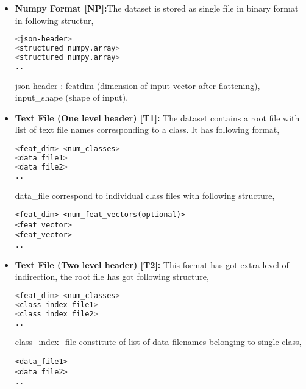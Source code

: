 \begin{itemize}
\item{\textbf {Numpy Format [NP]:}The dataset is stored as single file in binary format in following structur,
\begin{lstlisting}[language=bash,basicstyle=\small] 
<json-header>
<structured numpy.array>
<structured numpy.array>
..
\end{lstlisting}
json-header  : featdim (dimension of input vector after flattening), input\_shape (shape of input).}

\item{\textbf {Text File (One level header) [T1]:} The dataset contains a root file with list of  text file names corresponding to a class. It has following format,
\begin{lstlisting}[language=bash,basicstyle=\small] 
<feat_dim> <num_classes>
<data_file1>
<data_file2>
..
\end{lstlisting}
data\_file correspond to individual class files with following structure,
\begin{lstlisting}[basicstyle=\small] 
<feat_dim> <num_feat_vectors(optional)>
<feat_vector>
<feat_vector>
..
\end{lstlisting}}

\item{\textbf {Text File (Two level header) [T2]:} This format has got extra level of indirection, the root file has got following structure,
\begin{lstlisting}[language=bash,basicstyle=\small] 
<feat_dim> <num_classes>
<class_index_file1>
<class_index_file2>
..
\end{lstlisting}
class\_index\_file constitute of list of data filenames belonging to single class, 
\begin{lstlisting}[basicstyle=\small] 
<data_file1>
<data_file2>
..
\end{lstlisting}}
\end{itemize}

